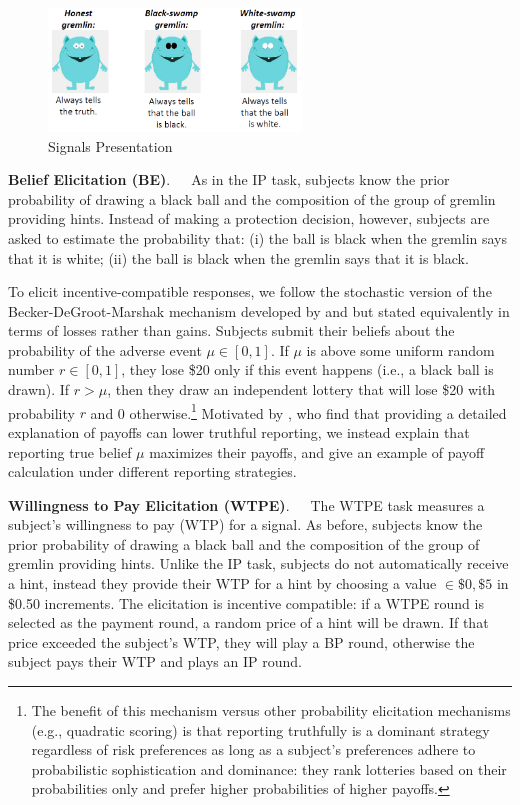 \documentclass[12pt,a4paper]{article}
\begin{document}
\begin{figure}[H]
\centering
\caption{Signals Presentation} \label{fig:Gremlins}
\includegraphics[width=0.6\textwidth]{Graphs/gremlins1.png}
\end{figure}


\bigskip
\noindent\textbf{Belief Elicitation (BE)}.\ \ \ 
As in the IP task, subjects know the prior probability of drawing a black ball and the composition of the group of gremlin providing hints. Instead of making a protection decision, however, subjects are asked to estimate the probability that: (i) the ball is black when the gremlin says that it is white; (ii) the ball is black when the gremlin says that it is black. 

To elicit incentive-compatible responses, we follow the stochastic version of the Becker-DeGroot-Marshak mechanism developed by \citet{grether_testing_1992} and \citet{holt_update_2009} but stated equivalently in terms of losses rather than gains.
Subjects submit their beliefs about the probability of the adverse event $\mu \in [0,1]$. If $\mu$ is above some uniform random number $r\in[0,1]$, they lose \$20 only if this event happens (i.e., a black ball is drawn). If $r > \mu$, then they draw an independent lottery that will lose \$20 with probability $r$ and 0 otherwise.\footnote{The benefit of this mechanism versus other probability elicitation mechanisms (e.g., quadratic scoring) is that reporting truthfully is a dominant strategy regardless of risk preferences \citep{karni_mechanism_2009-1} as long as a subject's preferences adhere to probabilistic sophistication and dominance: they rank lotteries based on their probabilities only and prefer higher probabilities of higher payoffs.} Motivated by \citet{danz_belief_2020}, who find that providing a detailed explanation of payoffs can lower truthful reporting, we instead explain that reporting true belief $\mu$ maximizes their payoffs, and give an example of payoff calculation under different reporting strategies.

\bigskip
\noindent\textbf{Willingness to Pay Elicitation (WTPE)}.\ \ \ The WTPE task measures a subject's willingness to pay (WTP) for a signal. As before, subjects know the prior probability of drawing a black ball and the composition of the group of gremlin providing hints.  Unlike the IP task, subjects do not automatically receive a hint, instead they provide their WTP for a hint by choosing a value $\in {\$0,\$5}$ in \$0.50 increments. The elicitation is incentive compatible: if a WTPE round is selected as the payment round, a random price of a hint will be drawn. If that price exceeded the subject's WTP, they will play a BP round, otherwise the subject pays their WTP and plays an IP round.  
\end{document}
